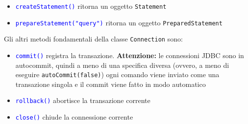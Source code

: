 \documentclass[12pt,a4paper]{book}
\begin{document}
	\begin{itemize}
		\item \textcolor{blue}{\texttt{createStatement()}} ritorna un oggetto \texttt{Statement}
		\item \textcolor{blue}{\texttt{prepareStatement("query")}} ritorna un oggetto \texttt{PreparedStatement}
	\end{itemize}
	Gli altri metodi fondamentali della classe \texttt{Connection} sono:
	\begin{itemize}
		\item \textcolor{blue}{\texttt{commit()}} registra la transazione. \textbf{Attenzione:} le connessioni JDBC sono in autocommit, quindi a meno di una specifica diversa (ovvero, a meno di eseguire \texttt{autoCommit(false)}) ogni comando viene inviato come una transazione singola e il commit viene fatto in modo automatico
		\item \textcolor{blue}{\texttt{rollback()}} abortisce la transazione corrente
		\item \textcolor{blue}{\texttt{close()}} chiude la connessione corrente
	\end{itemize}
\end{document}
